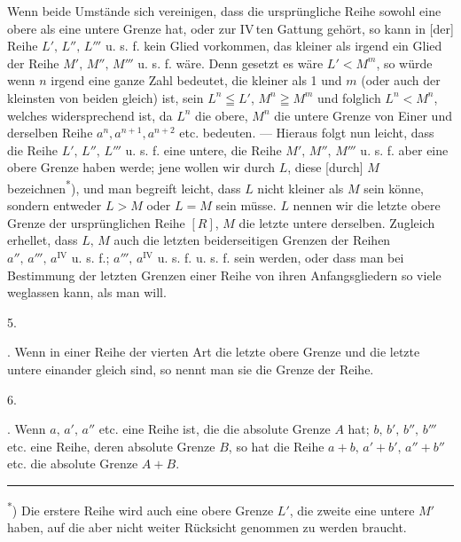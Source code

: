 \clearpage{}
\noindent\hspace*{\parindent}Wenn beide Umstände sich vereinigen, dass die ursprüngliche Reihe sowohl eine obere als eine untere Grenze hat, oder zur IV\,ten Gattung gehört, so kann in [der] Reihe \(L',\,L'',\,L'''\) u. s. f. kein Glied vorkommen, das kleiner als irgend ein Glied der Reihe \(M',\,M'',\,M'''\) u. s. f. wäre. Denn gesetzt es wäre \(L'<M^m\), so würde wenn \(n\) irgend eine ganze Zahl bedeutet, die kleiner als 1 und \(m\) (oder auch der kleinsten von beiden gleich) ist, sein \(L^n\leqq L'\), \(M^n\geqq M^m\) und folglich \(L^n<M^n\), welches widersprechend ist, da \(L^n\) die obere, \(M^n\) die untere Grenze von Einer und derselben Reihe \(a^n,a^{n+1},a^{n+2}\) etc. bedeuten. — Hieraus folgt nun leicht, dass die Reihe \(L',\,L'',\,L'''\) u. s. f. eine untere, die Reihe \(M',\,M'',\,M'''\) u. s. f. aber eine obere Grenze haben werde; jene wollen wir durch \(L\), diese [durch] \(M\) bezeichnen\textsuperscript{*}), und man begreift leicht, dass \(L\) nicht kleiner als \(M\) sein könne, sondern entweder \(L>M\) oder \(L=M\) sein müsse. \(L\) nennen wir die letzte obere Grenze der ursprünglichen Reihe \([R]\), \(M\) die letzte untere derselben. Zugleich erhellet, dass \(L,\,M\) auch die letzten beiderseitigen Grenzen der Reihen \(a'',\,a''',\,a^{\mathrm{IV}}\) u. s. f.; \(a''',\,a^{\mathrm{IV}}\) u. s. f. u. s. f. sein werden, oder dass man bei Bestimmung der letzten Grenzen einer Reihe von ihren Anfangsgliedern so viele weglassen kann, als man will.
\begin{center}5.\end{center}
\noindent\hspace*{\parindent}. Wenn in einer Reihe der vierten Art die letzte obere Grenze und die letzte untere einander gleich sind, so nennt man sie die  Grenze der Reihe.
\begin{center}6.\end{center}
\noindent\hspace*{\parindent}. Wenn \(a,\,a',\,a''\) etc. eine Reihe ist, die die absolute Grenze \(A\) hat; \(b,\,b',\,b'',\,b'''\) etc. eine Reihe, deren absolute Grenze \(B\), so hat die Reihe \(a+b,\,a'+b',\,a''+b''\) etc. die absolute Grenze \(A+B\).
\par\medskip\noindent\rule{.24\linewidth}{.4pt}\par\smallskip
{\small\noindent\hspace*{\parindent}\textsuperscript{*}) Die erstere Reihe wird auch eine obere Grenze \(L'\), die zweite eine untere \(M'\) haben, auf die aber nicht weiter Rücksicht genommen zu werden braucht.\par}
